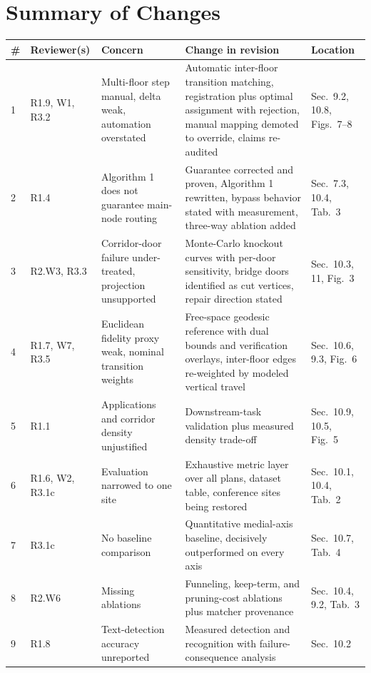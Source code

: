 \section*{Summary of Changes}
\begin{longtable}{p{0.5cm} p{2.0cm} p{4.6cm} p{4.9cm} p{2.9cm}}
\toprule
\# & Reviewer(s) & Concern & Change in revision & Location \\
\midrule
\endhead
1 & \textcolor{RevAllCol}{R1.9, W1, R3.2} & Multi-floor step manual, delta weak, automation overstated & Automatic inter-floor transition matching, registration plus optimal assignment with rejection, manual mapping demoted to override, claims re-audited & Sec.\ 9.2, 10.8, Figs.\ 7--8 \\
2 & \textcolor{RevOneCol}{R1.4} & Algorithm 1 does not guarantee main-node routing & Guarantee corrected and proven, Algorithm 1 rewritten, bypass behavior stated with measurement, three-way ablation added & Sec.\ 7.3, 10.4, Tab.\ 3 \\
3 & \textcolor{RevAllCol}{R2.W3, R3.3} & Corridor-door failure under-treated, projection unsupported & Monte-Carlo knockout curves with per-door sensitivity, bridge doors identified as cut vertices, repair direction stated & Sec.\ 10.3, 11, Fig.\ 3 \\
4 & \textcolor{RevAllCol}{R1.7, W7, R3.5} & Euclidean fidelity proxy weak, nominal transition weights & Free-space geodesic reference with dual bounds and verification overlays, inter-floor edges re-weighted by modeled vertical travel & Sec.\ 10.6, 9.3, Fig.\ 6 \\
5 & \textcolor{RevOneCol}{R1.1} & Applications and corridor density unjustified & Downstream-task validation plus measured density trade-off & Sec.\ 10.9, 10.5, Fig.\ 5 \\
6 & \textcolor{RevAllCol}{R1.6, W2, R3.1c} & Evaluation narrowed to one site & Exhaustive metric layer over all plans, dataset table, conference sites being restored & Sec.\ 10.1, 10.4, Tab.\ 2 \\
7 & \textcolor{RevThreeCol}{R3.1c} & No baseline comparison & Quantitative medial-axis baseline, decisively outperformed on every axis & Sec.\ 10.7, Tab.\ 4 \\
8 & \textcolor{RevTwoCol}{R2.W6} & Missing ablations & Funneling, keep-term, and pruning-cost ablations plus matcher provenance & Sec.\ 10.4, 9.2, Tab.\ 3 \\
9 & \textcolor{RevOneCol}{R1.8} & Text-detection accuracy unreported & Measured detection and recognition with failure-consequence analysis & Sec.\ 10.2 \\

\end{longtable}
